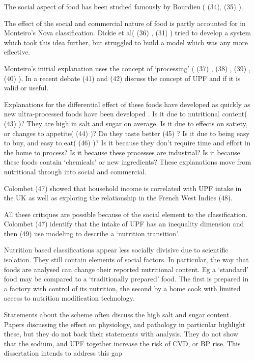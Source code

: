 \documentclass[
]{article}
\begin{document}
The social aspect of food has been studied famously by Bourdieu ( (34),
(35) ).

The effect of the social and commercial nature of food is partly
accounted for in Monteiro's Nova classification. Dickie et al( (36) ,
(31) ) tried to develop a system which took this idea further, but
struggled to build a model which was any more effective.

Monteiro's initial explanation uses the concept of `processing' ( (37) ,
(38) , (39) , (40) ). In a recent debate (41) and (42) discuss the
concept of UPF and if it is valid or useful.

Explanations for the differential effect of these foods have developed
as quickly as new ultra-processed foods have been developed . Is it due
to nutritional content( (43) )? They are high in salt and sugar on
average. Is it due to effects on satiety, or changes to appetite( (44)
)? Do they taste better (45) ? Is it due to being easy to buy, and easy
to eat( (46) )? Is it because they don't require time and effort in the
home to process? Is it because these processes are industrial? Is it
because these foods contain `chemicals' or new ingredients? These
explanations move from nutritional through into social and commercial.

Colombet (47) showed that household income is correlated with UPF intake
in the UK as well as exploring the relationship in the French West
Indies (48).

All these critiques are possible because of the social element to the
classification. Colombet (47) identify that the intake of UPF has an
inequality dimension and then (49) use modeling to describe a `nutrition
transition'.

Nutrition based classifications appear less socially divisive due to
scientific isolation. They still contain elements of social factors. In
particular, the way that foods are analysed can change their reported
nutritional content. Eg a `standard' food may be compared to a
`traditionally prepared' food. The first is prepared in a factory with
control of its nutrition, the second by a home cook with limited access
to nutrition modification technology.

Statements about the scheme often discuss the high salt and sugar
content. Papers discussing the effect on physiology, and pathology in
particular highlight these, but they do not back their statements with
analysis. They do not show that the sodium, and UPF together increase
the risk of CVD, or BP rise. This dissertation intends to address this
gap
\end{document}
